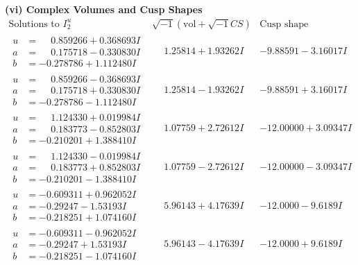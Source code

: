 \documentclass[1p]{elsarticle_modified}
\theoremstyle{definition}
\newcommand{\I}{\sqrt{-1}}
\begin{document}
\newpage\flushleft \textbf{(vi) Complex Volumes and Cusp Shapes}
$$\begin{array}{c|c|c}  
\text{Solutions to }I^u_{2}& \I (\text{vol} + \sqrt{-1}CS) & \text{Cusp shape}\\
 \hline 
\begin{aligned}
u &= \phantom{-}0.859266 + 0.368693 I \\
a &= \phantom{-}0.175718 - 0.330830 I \\
b &= -0.278786 + 1.112480 I\end{aligned}
 & \phantom{-}1.25814 + 1.93262 I & -9.88591 - 3.16017 I \\ \hline\begin{aligned}
u &= \phantom{-}0.859266 - 0.368693 I \\
a &= \phantom{-}0.175718 + 0.330830 I \\
b &= -0.278786 - 1.112480 I\end{aligned}
 & \phantom{-}1.25814 - 1.93262 I & -9.88591 + 3.16017 I \\ \hline\begin{aligned}
u &= \phantom{-}1.124330 + 0.019984 I \\
a &= \phantom{-}0.183773 - 0.852803 I \\
b &= -0.210201 + 1.388410 I\end{aligned}
 & \phantom{-}1.07759 + 2.72612 I & -12.00000 + 3.09347 I \\ \hline\begin{aligned}
u &= \phantom{-}1.124330 - 0.019984 I \\
a &= \phantom{-}0.183773 + 0.852803 I \\
b &= -0.210201 - 1.388410 I\end{aligned}
 & \phantom{-}1.07759 - 2.72612 I & -12.00000 - 3.09347 I \\ \hline\begin{aligned}
u &= -0.609311 + 0.962052 I \\
a &= -0.29247 - 1.53193 I \\
b &= -0.218251 + 1.074160 I\end{aligned}
 & \phantom{-}5.96143 + 4.17639 I & -12.0000 - 9.6189 I \\ \hline\begin{aligned}
u &= -0.609311 - 0.962052 I \\
a &= -0.29247 + 1.53193 I \\
b &= -0.218251 - 1.074160 I\end{aligned}
 & \phantom{-}5.96143 - 4.17639 I & -12.0000 + 9.6189 I \\ \hline\begin{aligned}

\end{aligned}
\end{array}$$
\end{document}
